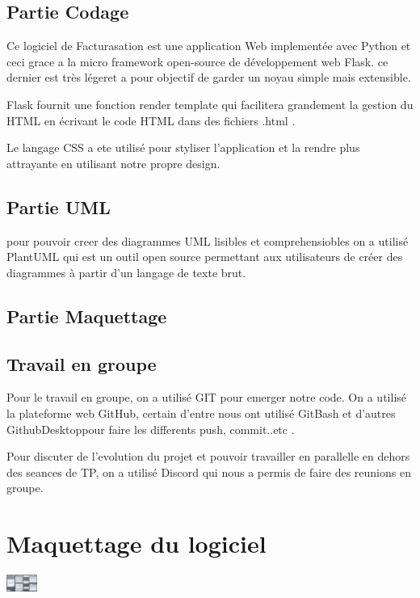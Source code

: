\documentclass[a4paper,10pt]{scrartcl}
\begin{document}
\subsection{Partie Codage}

Ce logiciel de Facturasation est une application Web implementée avec {\color{olive}Python} et ceci grace a la micro framework open-source de développement web {\color{olive}Flask}. ce dernier est très légeret a pour objectif de garder un noyau simple mais extensible.

Flask fournit une fonction render template qui  facilitera grandement la gestion du HTML en écrivant le code {\color{olive}HTML} dans des fichiers .html .

Le langage  {\color{olive}CSS} a ete utilisé pour styliser l’application et la rendre plus attrayante en utilisant notre propre design.

\subsection{Partie UML}
pour pouvoir creer des diagrammes UML lisibles et comprehensiobles on a utilisé {\color{olive}PlantUML} qui est un outil open source permettant aux utilisateurs de créer des diagrammes à partir d'un langage de texte brut.

\subsection{Partie Maquettage}

\subsection{Travail en groupe}

Pour le travail en groupe, on a utilisé {\color{olive}GIT} pour emerger notre code. On a utilisé  la plateforme web GitHub, certain  d'entre nous ont utilisé GitBash et d'autres GithubDesktoppour faire les differents push, commit..etc .

Pour discuter de l'evolution du projet et pouvoir travailler en parallelle en dehors des seances de TP, on a utilisé {\color{olive}Discord} qui nous a permis de faire des reunions en groupe.

\section{Maquettage du logiciel}
\centerline{\includegraphics[width=1cm]{maquettage.png}}
\end{document}
